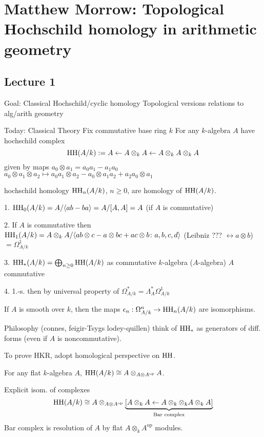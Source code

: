 \newpage
\section{Matthew Morrow: Topological Hochschild homology in arithmetic geometry}
\subsection{Lecture 1}

Goal: Classical Hochschild/cyclic homology
Topological versions
relations to alg/arith geometry

Today: Classical Theory
Fix commutative base ring $k$
For any $k$-algebra $A$ have hochschild complex
	\[
	\operatorname{HH}(A/k):= A \leftarrow A \otimes_k A \leftarrow A \otimes_k A \otimes_k A
	\]
given by maps $a_0 \otimes a_1= a_0 a_1 - a_1a_0$
$a_0 \otimes a_1 \otimes a_2 \mapsto a_0a_1 \otimes a_2 - a_0 \otimes a_1a_2 + a_2 a_0 \otimes a_1$



hochschild homology $\operatorname{HH}_n(A/k)$, $n\geq 0$, are homology of $\operatorname{HH}(A/k)$.

1. $\operatorname{HH}_0(A/k)= A/\langle ab-ba \rangle= A/[A,A]= A$ (if $A$ is commutative)

2. If $A$ is commutative then $\operatorname{HH}_1(A/k)= A \otimes_k A / \langle ab \otimes c - a \otimes bc + ac \otimes b \colon a,b,c,d \rangle$ (Leibniz ??? $\leftrightarrow a \otimes b$)$= \Omega_{A/k}^1$

3. $\operatorname{HH}_*(A/k)= \bigoplus_{n \geq 0} \operatorname{HH}(A/k)$ as commutative $k$-algebra ($A$-algebra)
$A$ commutative

4. 1.-s. then by universal property of $\Omega_{A/k}^*= \Lambda_A^* \Omega_{A/k}^1$


\begin{thm}
If $A$ is smooth over $k$, then the maps $\epsilon_n: \Omega_{A/k}^n \to \operatorname{HH}_n(A/k)$ are isomorphisms.
\end{thm}

Philosophy (connes, feigir-Tsygs lodey-quillen) think of $\operatorname{HH}_*$ as generators of diff. forms (even if $A$ is noncommutative).


To prove HKR, adopt homological perspective on $\operatorname{HH}$.

\begin{lem}
For any flat $k$-algebra $A$, $\operatorname{HH}(A/k) \cong A \otimes_{A \otimes A^\text{op}} A$.
\end{lem}

\pf Explicit isom. of complexes
	\[
	\operatorname{HH}(A/k) \cong A \otimes_{A \otimes A^\text{op}} \underbrace{[A \otimes_k A \leftarrow A \otimes_k \otimes_k A \otimes_k A]}_{\text{Bar complex}}
	\]
Bar complex is resolution of $A$ by flat $A \otimes_k A^\text{op}$ modules. 

